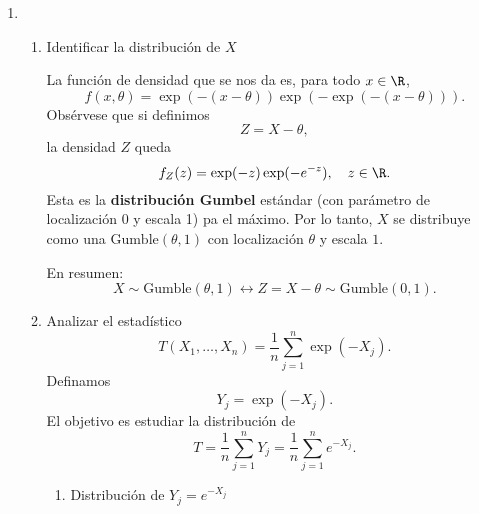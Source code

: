 \begin{enumerate}[label=\color{red}\textbf{\arabic*)}]
\item {}

\begin{enumerate}[label=\arabic*)]
    \item Identificar la distribución de $X$

        La función de densidad que se nos da es, para todo  $x\in \R$, \[
        f(x,\theta)=\exp(-(x-\theta))\exp\left( -\exp(-(x-\theta)) \right) .
        \] 
        Obsérvese que si definimos \[
        Z=X-\theta, 
        \] 
        la densidad $Z$ queda  \[
            f_Z(z)=\exp(-z)\exp(-e^{-z} ),\quad z \in \R.
        \] 
        Esta es la \textbf{distribución Gumbel} estándar (con parámetro de localización 0 y escala 1) pa el máximo. Por lo tanto, $X$ se distribuye como una $\mathrm{Gumble}(\theta,1)$  con localización $\theta$ y escala $1$.

        En resumen:  \[
        X\sim \mathrm{Gumble}(\theta,1)\longleftrightarrow Z=X-\theta\sim \mathrm{Gumble(0,1)} .
        \] 
    \item Analizar el estadístico
        \[
        T(X_1,\dots,X_n)=\dfrac{1}{n}\sum_{j=1}^{n} \exp(-X_j).
        \] 
        Definamos \[
        Y_j=\exp(-X_j).
        \] 
        El objetivo es estudiar la distribución de \[
        T=\dfrac{1}{n}\sum_{j=1}^{n} Y_j=\dfrac{1}{n}\sum_{j=1}^{n} e^{-X_j}. 
        \] 
        \begin{enumerate}[label=2.\arabic*)]
            \item Distribución de $Y_j=e^{-X_j} $ 


\end{enumerate}
\end{enumerate}
\end{enumerate}
